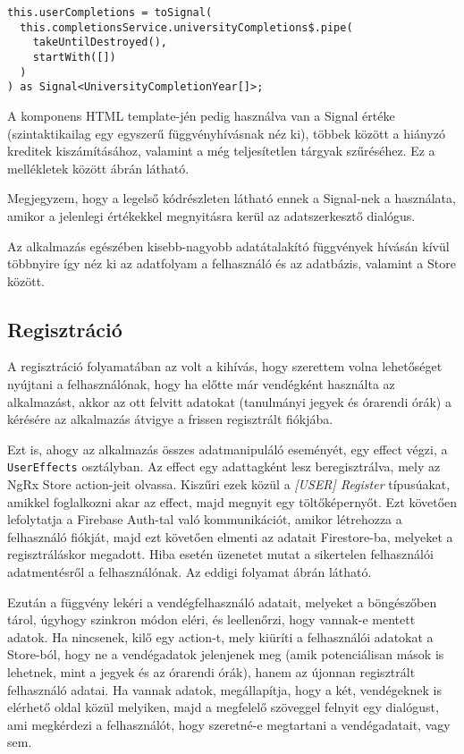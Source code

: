 \documentclass[a4paper,12pt]{report}
\begin{document}
\begin{samepage}
    \begin{verbatim}
this.userCompletions = toSignal(
  this.completionsService.universityCompletions$.pipe(
    takeUntilDestroyed(),
    startWith([])
  )
) as Signal<UniversityCompletionYear[]>;
    \end{verbatim}
\end{samepage}

A komponens HTML template-jén pedig használva van a Signal értéke (szintaktikailag egy egyszerű függvényhívásnak néz ki), többek között a hiányzó kreditek kiszámításához, valamint a még teljesítetlen tárgyak szűréséhez. Ez a mellékletek között  ábrán látható.

Megjegyzem, hogy a legelső kódrészleten látható ennek a Signal-nek a használata, amikor a jelenlegi értékekkel megnyitásra kerül az adatszerkesztő dialógus.

Az alkalmazás egészében kisebb-nagyobb adatátalakító függvények hívásán kívül többnyire így néz ki az adatfolyam a felhasználó és az adatbázis, valamint a Store között.

\subsection{Regisztráció}

A regisztráció folyamatában az volt a kihívás, hogy szerettem volna lehetőséget nyújtani a felhasználónak, hogy ha előtte már vendégként használta az alkalmazást, akkor az ott felvitt adatokat (tanulmányi jegyek és órarendi órák) a kérésére az alkalmazás átvigye a frissen regisztrált fiókjába.

Ezt is, ahogy az alkalmazás összes adatmanipuláló eseményét, egy effect végzi, a \verb|UserEffects| osztályban. Az effect egy adattagként lesz beregisztrálva, mely az NgRx Store action-jeit olvassa. Kiszűri ezek közül a \textit{[USER] Register} típusúakat, amikkel foglalkozni akar az effect, majd megnyit egy töltőképernyőt. Ezt követően lefolytatja a Firebase Auth-tal való kommunikációt, amikor létrehozza a felhasználó fiókját, majd ezt követően elmenti az adatait Firestore-ba, melyeket a regisztráláskor megadott. Hiba esetén üzenetet mutat a sikertelen felhasználói adatmentésről a felhasználónak. Az eddigi folyamat  ábrán látható.

Ezután a függvény lekéri a vendégfelhasználó adatait, melyeket a böngészőben tárol, úgyhogy szinkron módon eléri, és leellenőrzi, hogy vannak-e mentett adatok. Ha nincsenek, kilő egy action-t, mely kiüríti a felhasználói adatokat a Store-ból, hogy ne a vendégadatok jelenjenek meg (amik potenciálisan mások is lehetnek, mint a jegyek és az órarendi órák), hanem az újonnan regisztrált felhasználó adatai. Ha vannak adatok, megállapítja, hogy a két, vendégeknek is elérhető oldal közül melyiken, majd a megfelelő szöveggel felnyit egy dialógust, ami megkérdezi a felhasználót, hogy szeretné-e megtartani a vendégadatait, vagy sem.
\end{document}
